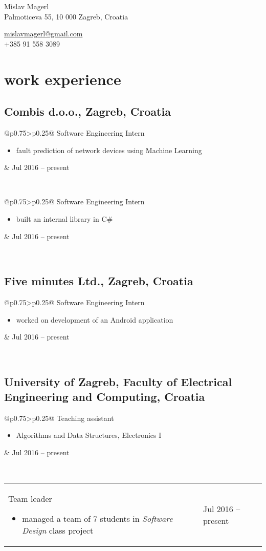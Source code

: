 \documentclass[a4paper]{article}
\makeatletter
\newlength{\tablewidth}
\newenvironment{period}[2]{%
\newcommand{\sarma}{#2}%
\setlength{\tablewidth}{\linewidth}
\addtolength{\tablewidth}{-2\tabcolsep}
\begin{tabular}{@{}p{0.75\tablewidth}>{\raggedleft\arraybackslash}p{0.25\tablewidth}@{}}%
#1 \newline
\begin{itemize}
}{%
\end{itemize} & \sarma \\%
\end{tabular}\\
}
\makeatother
\begin{document}
\fontfamily{\sfdefault}
\selectfont

\begin{minipage}{.5\textwidth}
\LARGE{Mislav Magerl}\\
\normalsize{Palmoticeva 55, 10 000 Zagreb, Croatia}
\end{minipage}%
\begin{minipage}{.5\textwidth}
\raggedleft
\href{mailto:mislavmagerl@gmail.com}{mislavmagerl@gmail.com} \\
+385 91 558 3089
\end{minipage}

\vspace{1em}

\section{work experience}
\subsection{Combis d.o.o., Zagreb, Croatia}
\begin{period}{Software Engineering Intern}{Jul 2016 -- present}
    \item 
        fault prediction of network devices using Machine Learning
        
\end{period}

\begin{period}{Software Engineering Intern}{Jan 2016 -- Feb 2016}
    \item 
        built an internal library in C\#
        
\end{period}
\subsection{Five minutes Ltd., Zagreb, Croatia}
\begin{period}{Software Engineering Intern}{Jul 2015 -- Aug 2015}
    \item 
        worked on development of an Android application
        
\end{period}
\subsection{University of Zagreb, Faculty of Electrical Engineering and Computing, Croatia}
\begin{period}{Teaching assistant}{Mar 2013 -- Jan 2014}
    \item Algorithms and Data Structures, Electronics I
\end{period}
\begin{period}{Team leader}{Sep 2014 -- Jan 2015}
    \item managed a team of 7 students in \textit{Software Design} class project
\end{period}
\end{document}
